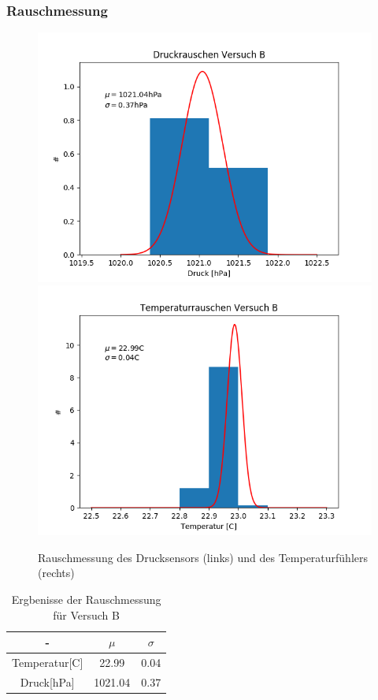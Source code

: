 \documentclass[12pt,a4paper]{article}
\begin{document}
\subsubsection{Rauschmessung}

\begin{figure}
\includegraphics[scale=0.5]{Bilder/DruckrauschenB}
\includegraphics[scale=0.5]{Bilder/TemprauschenB}
\caption[Rauschmessung Versuch B]{Rauschmessung des Drucksensors (links) und des Temperaturfühlers (rechts)}
\label{fig:RauschenB}
\end{figure}

\begin{table}
\begin{center}
\begin{tabular}{|c|c|c|}
\hline 
- & $\mu$ & $\sigma$\\ 
\hline 
Temperatur[C] & 22.99 & 0.04 \\ 
\hline 
Druck[hPa] & 1021.04 & 0.37\\ 
\hline 
\end{tabular}
\caption[Tabelle Rauschenmessung B]{Ergbenisse der Rauschmessung für Versuch B}
\label{tab:RauschenB}
\end{center}
\end{table}
\end{document}
